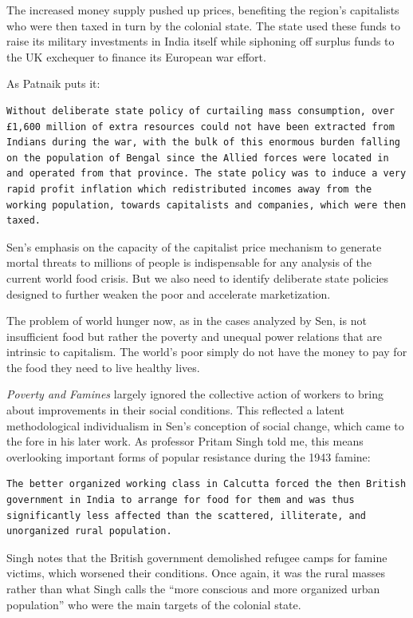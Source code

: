 \documentclass[
]{book}
\begin{document}
The increased money supply pushed up prices, benefiting the region's capitalists who were then taxed in turn by the colonial state. The state used these funds to raise its military investments in India itself while siphoning off surplus funds to the UK exchequer to finance its European war effort.

As Patnaik puts it:

\begin{verbatim}
Without deliberate state policy of curtailing mass consumption, over £1,600 million of extra resources could not have been extracted from Indians during the war, with the bulk of this enormous burden falling on the population of Bengal since the Allied forces were located in and operated from that province. The state policy was to induce a very rapid profit inflation which redistributed incomes away from the working population, towards capitalists and companies, which were then taxed.
\end{verbatim}

Sen's emphasis on the capacity of the capitalist price mechanism to generate mortal threats to millions of people is indispensable for any analysis of the current world food crisis. But we also need to identify deliberate state policies designed to further weaken the poor and accelerate marketization.

The problem of world hunger now, as in the cases analyzed by Sen, is not insufficient food but rather the poverty and unequal power relations that are intrinsic to capitalism. The world's poor simply do not have the money to pay for the food they need to live healthy lives.

\emph{Poverty and Famines} largely ignored the collective action of workers to bring about improvements in their social conditions. This reflected a latent methodological individualism in Sen's conception of social change, which came to the fore in his later work. As professor Pritam Singh told me, this means overlooking important forms of popular resistance during the 1943 famine:

\begin{verbatim}
The better organized working class in Calcutta forced the then British government in India to arrange for food for them and was thus significantly less affected than the scattered, illiterate, and unorganized rural population.
\end{verbatim}

Singh notes that the British government demolished refugee camps for famine victims, which worsened their conditions. Once again, it was the rural masses rather than what Singh calls the ``more conscious and more organized urban population'' who were the main targets of the colonial state.
\end{document}
